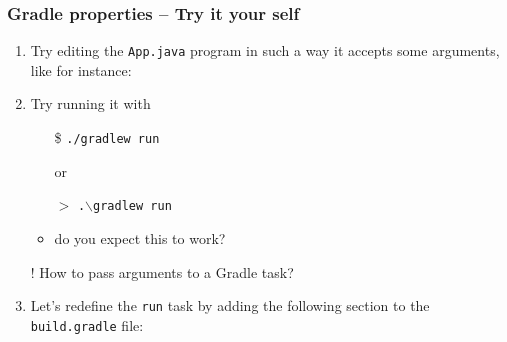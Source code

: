 \documentclass[handout]{beamer}\mode<presentation>{\usetheme{AMSCesenaBleu}}
\begin{document}
\begin{frame}[allowframebreaks]
\frametitle{Gradle properties -- Try it your self}
    \begin{enumerate}
        \item Try editing the \texttt{App.java} program in such a way it accepts some arguments, like for instance:
        
        
        \item Try running it with
        \begin{itemize}
            \item[\$] \texttt{./gradlew run}
            \item[] or
            \item[$>$] \texttt{.$\backslash$gradlew run}
            \item[]
            \item do you expect this to work?
        \end{itemize}
    \end{enumerate}
    \begin{itemize}
        \item[!] How to pass arguments to a Gradle task?
    \end{itemize}
    
    \framebreak
    
    \begin{enumerate}\setcounter{enumi}{2}
        \item Let's redefine the \texttt{run} task by \alert{adding} the following section to the \texttt{build.gradle} file:
        
        

\end{enumerate}
\end{frame}
\end{document}

